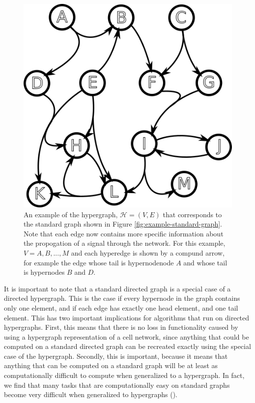 \documentclass[12pt,twoside]{reedthesis}
\theoremstyle{definition}
\begin{document}
\begin{figure}[thbp]
  \begin{center}
    \includegraphics{example-hypergraph}
  \caption[An example directed hypergraph]{An example of the hypergraph, $\mathcal{H}=(V,E)$ that corresponds to the standard graph shown in Figure \ref{fig:example-standard-graph}. Note that each edge now contains more specific information about the propogation of a signal through the network. For this example, $V={A,B,...,M}$ and each hyperedge is shown by a compund arrow, for example the edge whose tail is hypernodenode $A$ and whose tail is hypernodes $B$ and $D$.}
  \label{fig:example-hypergraph}
  \end{center}
\end{figure}

It is important to note that a standard directed graph is a special case of a directed hypergraph.  This is the case if every hypernode in the graph contains only one element, and if each edge has exactly one head element, and one tail element.  This has two important implications for algorithms that run on directed hypergraphs.  First, this means that there is no loss in functionality caused by using a hypergraph representation of a cell network, since anything that could be computed on a standard directed graph can be recreated exactly using the special case of the hypergraph. Secondly, this is important, because it means that anything that can be computed on a standard graph will be at least as computationally difficult to compute when generalized to a hypergraph.  In fact, we find that many tasks that are computationally easy on standard graphs become very difficult when generalized to hypergraphs (\cite{Ritz2014a}).\par
\end{document}
